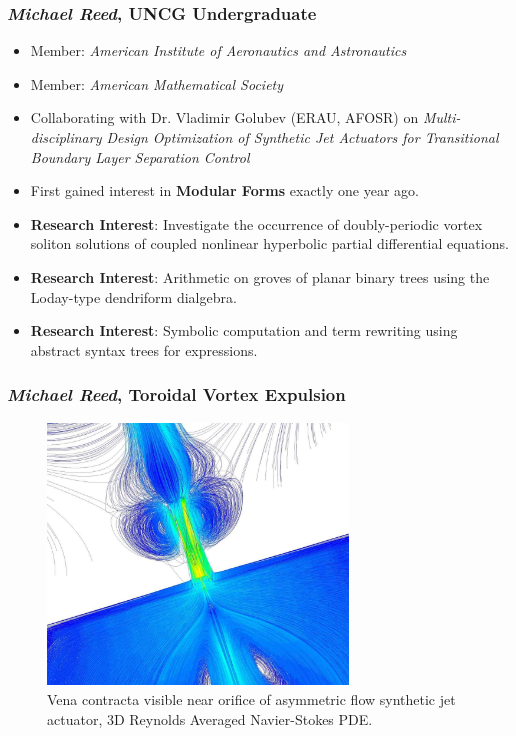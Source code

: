 \documentclass{beamer}
\begin{document}
\begin{frame}
\frametitle{\textit{Michael Reed}, UNCG Undergraduate}
\begin{itemize}
	\item Member: \textit{American Institute of Aeronautics and Astronautics}
	\item Member: \textit{American Mathematical Society}
	\item Collaborating with Dr. Vladimir Golubev (ERAU, AFOSR) on \textit{Multi-disciplinary Design Optimization of Synthetic Jet Actuators for Transitional Boundary Layer Separation Control}
	\item First gained interest in \textbf{Modular Forms} exactly one year ago.
	\item \textbf{Research Interest}: Investigate the occurrence of doubly-periodic vortex soliton solutions of coupled nonlinear hyperbolic partial differential equations.
	\item \textbf{Research Interest}: Arithmetic on groves of planar binary trees using the Loday-type dendriform dialgebra. 
	\item \textbf{Research Interest}: Symbolic computation and term rewriting using abstract syntax trees for expressions.
\end{itemize}
\end{frame}
\begin{frame}
\frametitle{\textit{Michael Reed}, Toroidal Vortex Expulsion}
\begin{figure}[ht]\centering
	\includegraphics[width=8cm]{kev.jpg}
	\caption{Vena contracta visible near orifice of asymmetric flow synthetic jet actuator, 3D Reynolds Averaged Navier-Stokes PDE.}
\end{figure}
\end{frame}
\end{document}
